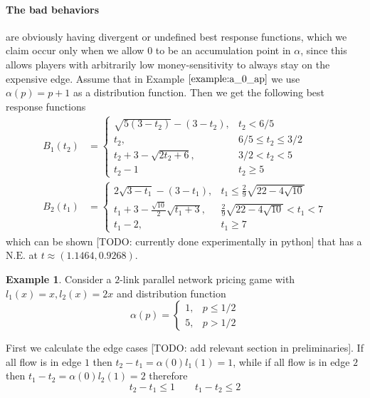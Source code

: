 \documentclass[10pt,a4paper]{book}
\newcommand{\NE}{\mathrm{N.E.}}
\theoremstyle{definition}
\theoremstyle{comment}
\newtheorem{example}[definition]{Example}
\begin{document}
\paragraph{The bad behaviors} are obviously having divergent or undefined best response functions, which we claim occur only when we allow $0$ to be an accumulation point in $\alpha$, since this allows players with arbitrarily low money-sensitivity to always stay on the expensive edge.
Assume that in Example $\ref{example:a_0_ap}$ we use $\alpha(p) = p + 1$ as a distribution function.
Then we get the following best response functions
\begin{align*}
	B_1(t_2) &=
	\begin{cases}
		\sqrt{5 (3 - t_2)} - (3 - t_2), & t_2 < 6/5 \\
		t_2, & 6/5 \le t_2 \le 3/2 \\
		t_2 + 3 - \sqrt{2 t_2 + 6}, & 3/2 < t_2 < 5 \\
		t_2 - 1 & t_2 \ge 5
	\end{cases}\\
	B_2(t_1) &=
	\begin{cases}
		2 \sqrt{3 - t_1} - (3 - t_1), & t_1 \le \frac29 \sqrt{22 - 4 \sqrt{10}} \\
		t_1 + 3 - \frac{\sqrt{10}}2 \sqrt{t_1 + 3}, & \frac29 \sqrt{22 - 4 \sqrt{10}} < t_1 < 7 \\
		t_1 - 2, & t_1 \ge 7
	\end{cases}
\end{align*}
which can be shown [TODO: currently done experimentally in python] that has a $\NE$ at $t \approx (1.1464, 0.9268)$.

\begin{example}
	Consider a $2$-link parallel network pricing game with $l_1(x) = x, l_2(x) = 2x$ and distribution function
	\[
		\alpha(p) =
		\begin{cases}
			1, & p \le 1/2 \\
			5, & p > 1/2
		\end{cases}
	\]
\end{example}

First we calculate the edge cases [TODO: add relevant section in preliminaries].
If all flow is in edge $1$ then $t_2 - t_1 = \alpha(0) l_1(1) = 1$, while if all flow is in edge $2$ then $t_1 - t_2 = \alpha(0) l_2(1) = 2$ therefore
\[t_2 - t_1 \le 1 \qquad t_1 - t_2 \le 2\]
\end{document}
